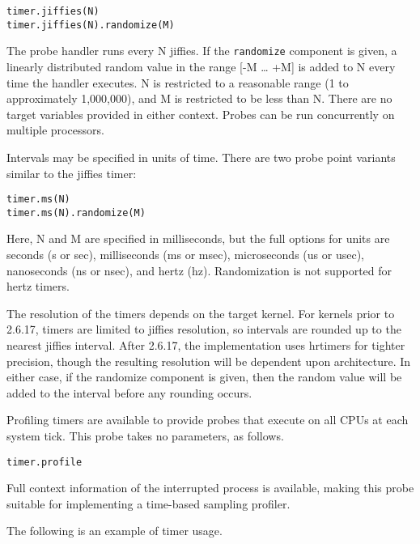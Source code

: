 \documentclass[twoside,english]{article}
\newenvironment{vindent}
{\begin{list}{}{\setlength{\listparindent}{6pt}}
\item[]}
{\end{list}}
\begin{document}
\begin{vindent}
\begin{verbatim}
timer.jiffies(N)
timer.jiffies(N).randomize(M)
\end{verbatim}
\end{vindent}
The probe handler runs every N jiffies. If the \texttt{randomize}
component is given, a linearly distributed random value in the range {[}-M
\ldots{} +M] is added to N every time the handler executes. N is restricted
to a reasonable range (1 to approximately 1,000,000), and M is restricted
to be less than N. There are no target variables provided in either context.
Probes can be run concurrently on multiple processors.

Intervals may be specified in units of time. There are two probe point variants
similar to the jiffies timer:

\begin{vindent}
\begin{verbatim}
timer.ms(N)
timer.ms(N).randomize(M)
\end{verbatim}
\end{vindent}
Here, N and M are specified in milliseconds, but the
full options for units are seconds (s or sec), milliseconds (ms or msec),
microseconds (us or usec), nanoseconds (ns or nsec), and hertz (hz). Randomization
is not supported for hertz timers.

The resolution of the timers depends on the target kernel. For kernels prior
to 2.6.17, timers are limited to jiffies resolution, so intervals are rounded
up to the nearest jiffies interval. After 2.6.17, the implementation uses
hrtimers for tighter precision, though the resulting resolution will be dependent
upon architecture. In either case, if the randomize component is given, then
the random value will be added to the interval before any rounding occurs.

Profiling timers are available to provide probes that execute on all CPUs
at each system tick. This probe takes no parameters, as follows.

\begin{vindent}
\begin{verbatim}
timer.profile
\end{verbatim}
\end{vindent}
Full context information of the interrupted process is available, making
this probe suitable for implementing a time-based sampling profiler.

The following is an example of timer usage.
\end{document}
